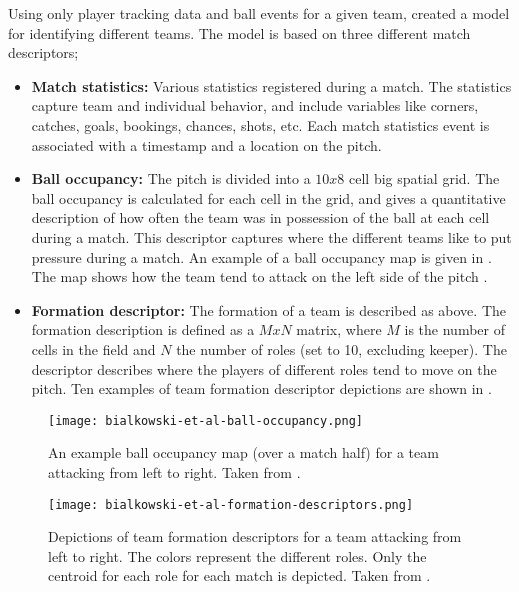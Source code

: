 Using only player tracking data and ball events for a given team, \citet{bib:bialkowski-lucey-carr-yue-sridharan-matthews-2014} created a model for identifying different teams. The model is based on three different match descriptors;

\begin{itemize}
    \item \textbf{Match statistics:} Various statistics registered during a match. The statistics capture team and individual behavior, and include variables like corners, catches, goals, bookings, chances, shots, etc. Each match statistics event is associated with a timestamp and a location on the pitch.
    \item \textbf{Ball occupancy:} The pitch is divided into a $10x8$ cell big spatial grid. The ball occupancy is calculated for each cell in the grid, and gives a quantitative description of how often the team was in possession of the ball at each cell during a match. This descriptor captures where the different teams like to put pressure during a match. An example of a ball occupancy map is given in . The map shows how the team tend to attack on the left side of the pitch \citep{bib:bialkowski-lucey-carr-yue-sridharan-matthews-2014}.
    \item \textbf{Formation descriptor:} The formation of a team is described as above. The formation description is defined as a $MxN$ matrix, where $M$ is the number of cells in the field and $N$ the number of roles (set to 10, excluding keeper). The descriptor describes where the players of different roles tend to move on the pitch. Ten examples of team formation descriptor depictions are shown in .
\end{itemize}

\begin{figure}
    \centering
    \texttt{[image: bialkowski-et-al-ball-occupancy.png]}
    \caption{An example ball occupancy map (over a match half) for a team attacking from left to right. Taken from \citet{bib:bialkowski-lucey-carr-yue-sridharan-matthews-2014}.}
    \label{fig:bialkowski-et-al-ball-occupancy}
\end{figure}

\begin{figure}
    \centering
    \texttt{[image: bialkowski-et-al-formation-descriptors.png]}
    \caption{Depictions of team formation descriptors for a team attacking from left to right. The colors represent the different roles. Only the centroid for each role for each match is depicted. Taken from \citet{bib:bialkowski-lucey-carr-yue-sridharan-matthews-2014}.}
    \label{fig:bialkowski-et-al-formation-descriptors}
\end{figure}

